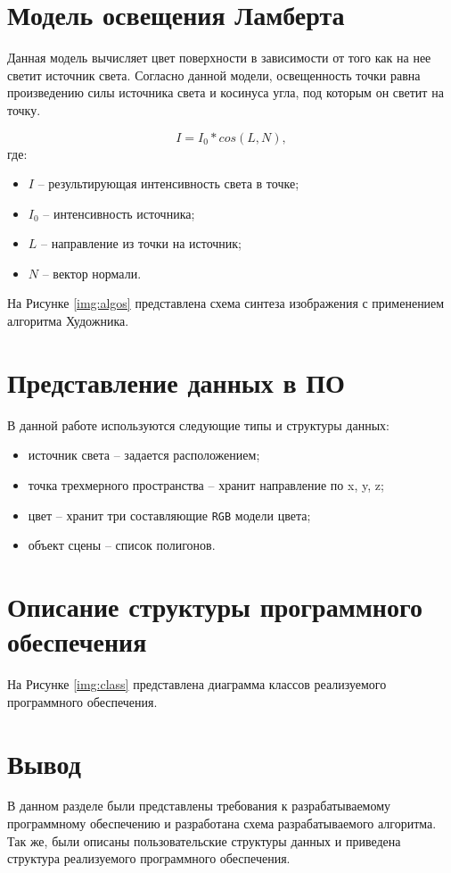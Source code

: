 \section{Модель освещения Ламберта}

Данная модель вычисляет цвет поверхности в зависимости от того как на нее светит источник света. Согласно данной модели, освещенность точки равна произведению силы источника света и косинуса угла, под которым он светит на точку.

\begin{equation}
	\label{eq:lambert}
	I = I_0 * cos(L, N),
\end{equation}
где:
\begin{itemize}
	\item $I$ -- результирующая интенсивность света в точке;
	\item $I_0$ -- интенсивность источника;
	\item $L$ -- направление из точки на источник;
	\item $N$ -- вектор нормали.
\end{itemize}

На Рисунке \ref{img:algos} представлена схема синтеза изображения с применением алгоритма Художника.
\clearpage


\section{Представление данных в ПО}

В данной работе используются следующие типы и структуры данных:

\begin{itemize}
    \item источник света -- задается расположением;
	\item точка трехмерного пространства -- хранит направление по x, y, z;
	\item цвет -- хранит три составляющие \texttt{RGB} модели цвета;
	\item объект сцены -- список полигонов.
\end{itemize}

\section{Описание структуры программного обеспечения}

На Рисунке \ref{img:class} представлена диаграмма классов реализуемого программного обеспечения.



\section{Вывод}

В данном разделе были представлены требования к разрабатываемому программному обеспечению и разработана схема разрабатываемого алгоритма. Так же, были описаны пользовательские структуры данных и приведена структура реализуемого программного обеспечения.